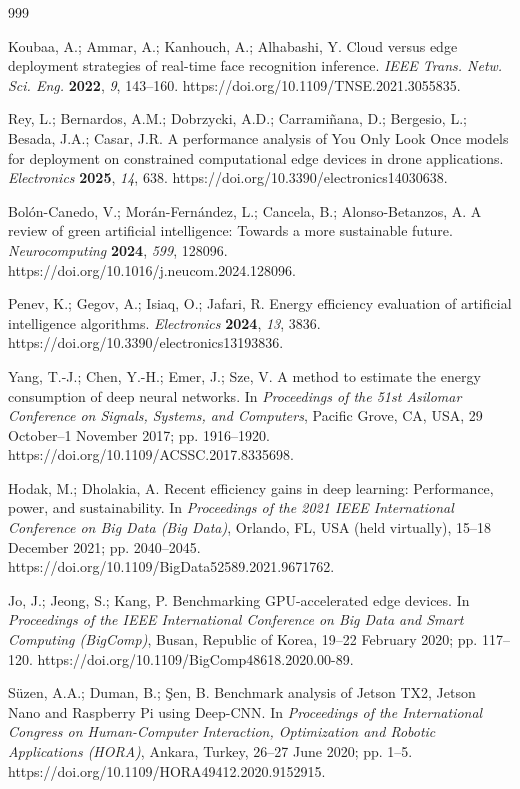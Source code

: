 \documentclass[electronics,article,submit,pdftex,moreauthors]{Definitions/mdpi}
\begin{document}
\begin{thebibliography}{999}

Koubaa, A.; Ammar, A.; Kanhouch, A.; Alhabashi, Y. Cloud versus edge deployment strategies of real-time face recognition inference. \emph{IEEE Trans. Netw. Sci. Eng.} \textbf{2022}, \emph{9}, 143--160. https://doi.org/10.1109/TNSE.2021.3055835.

Rey, L.; Bernardos, A.M.; Dobrzycki, A.D.; Carrami\~nana, D.; Bergesio, L.; Besada, J.A.; Casar, J.R. A performance analysis of You Only Look Once models for deployment on constrained computational edge devices in drone applications. \emph{Electronics} \textbf{2025}, \emph{14}, 638. https://doi.org/10.3390/electronics14030638.

Bol\'on-Canedo, V.; Mor\'an-Fern\'andez, L.; Cancela, B.; Alonso-Betanzos, A. A review of green artificial intelligence: Towards a more sustainable future. \emph{Neurocomputing} \textbf{2024}, \emph{599}, 128096. https://doi.org/10.1016/j.neucom.2024.128096.

Penev, K.; Gegov, A.; Isiaq, O.; Jafari, R. Energy efficiency evaluation of artificial intelligence algorithms. \emph{Electronics} \textbf{2024}, \emph{13}, 3836. https://doi.org/10.3390/electronics13193836.

Yang, T.-J.; Chen, Y.-H.; Emer, J.; Sze, V. A method to estimate the energy consumption of deep neural networks. In \emph{Proceedings of the 51st Asilomar Conference on Signals, Systems, and Computers}, Pacific Grove, CA, USA, 29 October--1 November 2017; pp. 1916--1920. https://doi.org/10.1109/ACSSC.2017.8335698.

Hodak, M.; Dholakia, A. Recent efficiency gains in deep learning: Performance, power, and sustainability. In \emph{Proceedings of the 2021 IEEE International Conference on Big Data (Big Data)}, Orlando, FL, USA (held virtually), 15--18 December 2021; pp. 2040--2045. https://doi.org/10.1109/BigData52589.2021.9671762.

Jo, J.; Jeong, S.; Kang, P. Benchmarking GPU-accelerated edge devices. In \emph{Proceedings of the IEEE International Conference on Big Data and Smart Computing (BigComp)}, Busan, Republic of Korea, 19--22 February 2020; pp. 117--120. https://doi.org/10.1109/BigComp48618.2020.00-89.

S\"uzen, A.A.; Duman, B.; \c{S}en, B. Benchmark analysis of Jetson TX2, Jetson Nano and Raspberry Pi using Deep-CNN. In \emph{Proceedings of the International Congress on Human-Computer Interaction, Optimization and Robotic Applications (HORA)}, Ankara, Turkey, 26--27 June 2020; pp. 1--5. https://doi.org/10.1109/HORA49412.2020.9152915.


\end{thebibliography}
\end{document}

